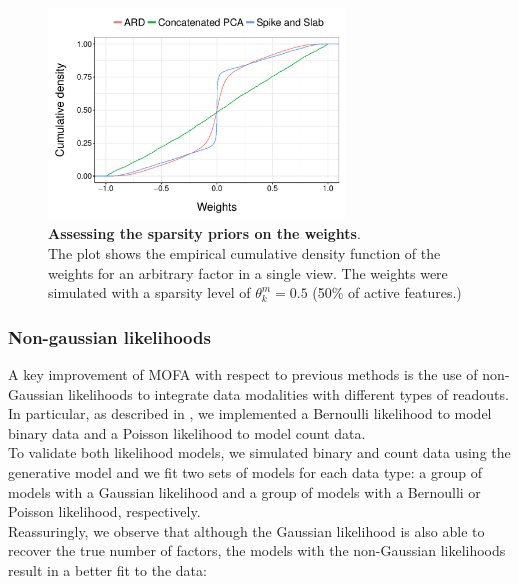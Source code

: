 \begin{figure}[H]
	\centering 	
	\includegraphics[width=0.7\textwidth]{MOFA_sparsity}
	\caption{\textbf{Assessing the sparsity priors on the weights}.\\ 
	The plot shows the empirical cumulative density function of the weights for an arbitrary factor in a single view. The weights were simulated with a sparsity level of $\theta_k^m=0.5$ (50\% of active features.)
	}
	\label{fig:MOFA_sparsity}
\end{figure}


\subsubsection{Non-gaussian likelihoods}  \label{section:mofa_nongaussian_results}
A key improvement of MOFA with respect to previous methods is the use of non-Gaussian likelihoods to integrate data modalities with different types of readouts. In particular, as described in , we implemented a Bernoulli likelihood to model binary data and a Poisson likelihood to model count data.\\
To validate both likelihood models, we simulated binary and count data using the generative model and we fit two sets of models for each data type: a group of models with a Gaussian likelihood and a group of models with a Bernoulli or Poisson likelihood, respectively.\\
Reassuringly, we observe that although the Gaussian likelihood is also able to recover the true number of factors, the models with the non-Gaussian likelihoods result in a better fit to the data:

